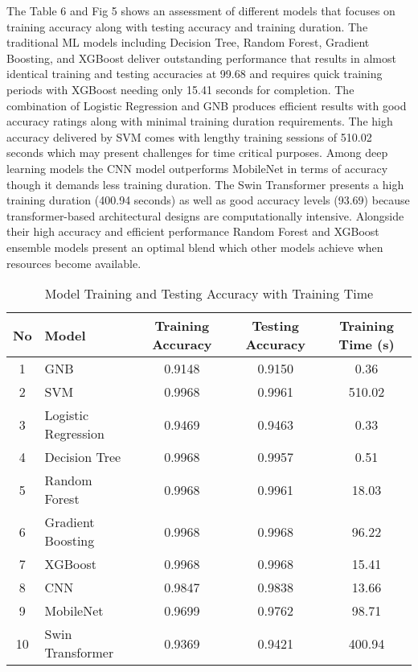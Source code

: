 \documentclass[runningheads]{llncs}
\begin{document}
The Table 6 and Fig 5 shows an assessment of different models that focuses on training accuracy along with testing accuracy and training duration. The traditional ML models including Decision Tree, Random Forest, Gradient Boosting, and XGBoost deliver outstanding performance that results in almost identical training and testing accuracies at 99.68 and requires quick training periods with XGBoost needing only 15.41 seconds for completion. The combination of Logistic Regression and GNB produces efficient results with good accuracy ratings along with minimal training duration requirements. The high accuracy delivered by SVM comes with lengthy training sessions of 510.02 seconds which may present challenges for time critical purposes. Among deep learning models the CNN model outperforms MobileNet in terms of accuracy though it demands less training duration. The Swin Transformer presents a high training duration (400.94 seconds) as well as good accuracy levels (93.69) because transformer-based architectural designs are computationally intensive. Alongside their high accuracy and efficient performance Random Forest and XGBoost ensemble models present an optimal blend which other models achieve when resources become available.

\begin{table}[ht]
\caption{Model Training and Testing Accuracy with Training Time}
\centering
\begin{tabular}{|c|l|c|c|c|}
\hline
\textbf{No} & \textbf{Model} & \textbf{Training Accuracy} & \textbf{Testing Accuracy} & \textbf{Training Time (s)} \\
\hline
1 & GNB & 0.9148 & 0.9150 & 0.36 \\
2 & SVM & 0.9968 & 0.9961 & 510.02 \\
3 & Logistic Regression & 0.9469 & 0.9463 & 0.33 \\
4 & Decision Tree & 0.9968 & 0.9957 & 0.51 \\
5 & Random Forest & 0.9968 & 0.9961 & 18.03 \\
6 & Gradient Boosting & 0.9968 & 0.9968 & 96.22 \\
7 & XGBoost & 0.9968 & 0.9968 & 15.41 \\
8 & CNN & 0.9847 & 0.9838 & 13.66 \\
9 & MobileNet & 0.9699 & 0.9762 & 98.71 \\
10 & Swin Transformer & 0.9369 & 0.9421 & 400.94 \\
\hline
\end{tabular}
\label{tab:model_accuracy_time}
\end{table}
\end{document}
